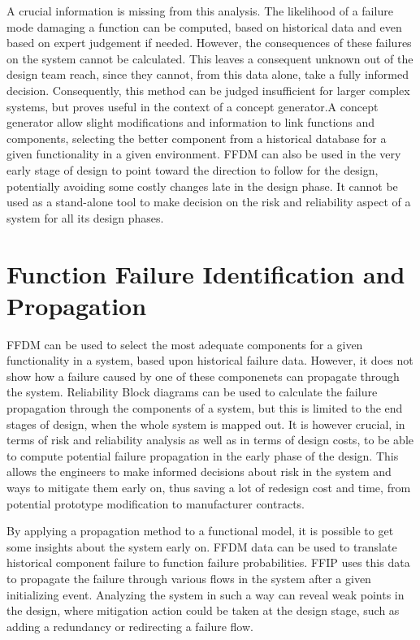 A crucial information is missing from this analysis. The likelihood of a failure mode damaging a function can be computed, based on historical data and even based on expert judgement if needed. However, the consequences of these failures on the system cannot be calculated. This leaves a consequent unknown out of the design team reach, since they cannot, from this data alone, take a fully informed decision. Consequently, this method can be judged insufficient for larger complex systems, but proves useful in the context of a concept generator.A concept generator allow slight modifications and information to link functions and components, selecting the better component from a historical database for a given functionality in a given environment. FFDM can also be used in the very early stage of design to point toward the direction to follow for the design, potentially avoiding some costly changes late in the design phase. It cannot be used as a stand-alone tool to make decision on the risk and reliability aspect of a system for all its design phases.

\section{Function Failure Identification and Propagation}
\label{chap:ffip}

FFDM can be used to select the most adequate components for a given functionality in a system, based upon historical failure data. However, it does not show how a failure caused by one of these componenets can propagate through the system. Reliability Block diagrams can be used to calculate the failure propagation through the components of a system, but this is limited to the end stages of design, when the whole system is mapped out. It is however crucial, in terms of risk and reliability analysis as well as in terms of design costs, to be able to compute potential failure propagation in the early phase of the design. This allows the engineers to make informed decisions about risk in the system and ways to mitigate them early on, thus saving a lot of redesign cost and time, from potential prototype modification to manufacturer contracts.

By applying a propagation method to a functional model, it is possible to get some insights about the system early on. FFDM data can be used to translate historical component failure to function failure probabilities. FFIP uses this data to propagate the failure through various flows in the system after a given initializing event. Analyzing the system in such a way can reveal weak points in the design, where mitigation action could be taken at the design stage, such as adding a redundancy or redirecting a failure flow.

